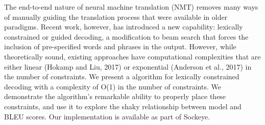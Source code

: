 The end-to-end nature of neural machine translation (NMT) removes many ways of manually guiding the translation process that were available in older paradigms. Recent work, however, has introduced a new capability: lexically constrained or guided decoding, a modification to beam search that forces the inclusion of pre-specified words and phrases in the output. However, while theoretically sound, existing approaches have computational complexities that are either linear (Hokamp and Liu, 2017) or exponential (Anderson et al., 2017) in the number of constraints. We present a algorithm for lexically constrained decoding with a complexity of O(1) in the number of constraints. We demonstrate the algorithm's remarkable ability to properly place these constraints, and use it to explore the shaky relationship between model and BLEU scores. Our implementation is available as part of Sockeye.
